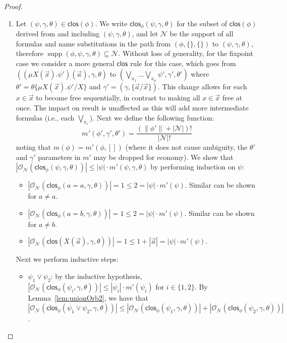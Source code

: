 \documentclass[10pt,a4paper]{article}
\theoremstyle{definition}
\theoremstyle{remark}
\DeclareMathOperator{\supp}{supp}
\newcommand\Ncal{\mathcal{N}}
\newcommand\orb[1][]{\mathcal{O}_{#1}}
\newcommand{\clos}[0]{\mathsf{clos}}
\begin{document}
\begin{proof}
\begin{enumerate}
\begin{itemize}
			The case for $(\nu X(\vec x).\phi')(\vec a)$ is similar.
		\end{itemize}		
		\item 
												Let $(\psi, \gamma, \theta) \in \clos(\phi)$. 
		We write $\clos_\phi(\psi, \gamma, \theta)$ for the subset of $\clos(\phi)$ derived from and including $(\psi,\gamma, \theta)$, and let $\Ncal$ be the support of all formulas and name substitutions in the path from $(\phi,\{\}, \{\})$ to $(\psi,\gamma, \theta)$,
		therefore $\supp(\phi, \psi, \gamma, \theta) \subseteq \Ncal$.
				Without loss of generality, for the fixpoint case we consider a more general $\clos$ rule for this case, which goes from $((\mu X(\vec x).\psi')(\vec a),\gamma, \theta)$ to $(\bigvee\nolimits_{x_1}\dots\bigvee\nolimits_{x_n}\psi',\gamma',\theta')$ where $\theta' = \theta\{\mu X(\vec x).\psi' / X\}$ and $\gamma' = (\gamma, \{\vec a / \vec x\})$. 
		This change allows for each $x \in \vec x$ to become free sequentially, in contrast to making all $x \in \vec x$ free at once. 
		The impact on result is unaffected as this will add more intermediate formulas (i.e., each $\bigvee_{x_i}$).
				Next we define the following function:
		\[
		m'(\phi', \gamma', \theta') = \frac{(\|\phi'\| + |\Ncal|)!}{|\Ncal|!}
		\]
		noting that $m(\phi) = m'(\phi, [])$ (where it does not cause ambiguity, the $\theta'$ and $\gamma'$ parameters in $m'$ may be dropped for economy).
		We show that $|\orb[\Ncal](\clos_\phi(\psi, \gamma, \theta))| \le |\psi|\cdot m'(\psi, \gamma, \theta)$
				by performing induction on $\psi$:
				\begin{itemize}
			\item $|\orb[\Ncal](\clos_\phi(a = a, \gamma, \theta))|= 1 \le 2 = |\psi|\cdot m'(\psi)$.
			Similar can be shown for $a \neq a$.
			\item $|\orb[\Ncal](\clos_\phi(a = b, \gamma, \theta))| = 1 \le 2 = |\psi|\cdot m'(\psi)$.
			Similar can be shown for $a \neq b$.
			\item $|\orb[\Ncal](\clos(X(\vec a), \gamma, \theta))| = 1 \le 1 + |\vec a| = |\psi|\cdot m'(\psi)$.
		\end{itemize}
		Next we perform inductive steps:
		\begin{itemize}
			\item $\psi_1 \lor \psi_2$: by the inductive hypothesis, $|\orb[\Ncal](\clos_\phi(\psi_i,\gamma, \theta))| \le |\psi_i|\cdot m'(\psi_i)$ for $i \in \{1, 2\}$.
			By Lemma~\ref{lem:unionOrb2},
						we have that $|\orb[\Ncal](\clos_\phi(\psi_1 \lor \psi_2,\gamma, \theta))| \le |\orb[\Ncal](\clos_\phi(\psi_1, \gamma, \theta))| + |\orb[\Ncal](\clos_\phi(\psi_2,\gamma, \theta))|$.

\end{itemize}
\end{enumerate}
\end{proof}
\end{document}
